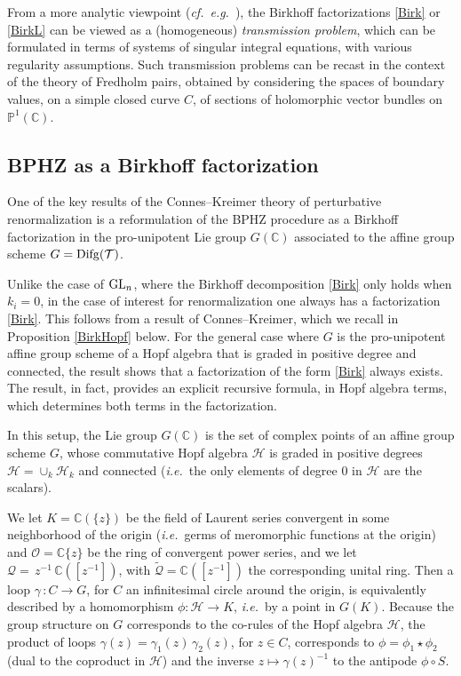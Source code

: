 \documentclass[10pt]{amsart}
\def\C{{\mathbb C}}
\renewcommand{\P}{{\mathbb P}}
\def\cH{{\mathcal H}}
\renewcommand{\O}{{\mathcal O}}
\def\Qc{{\mathcal Q}}
\def\sT{{\mathcal T}}
\def\GL{{\rm GL}}
\newcommand{\ie}{{\it i.e.\/}\ }
\newcommand{\eg}{{\it e.g.\/}\ }
\newcommand{\cf}{{\it cf.\/}\ }
\numberwithin{equation}{section}
\begin{document}
\smallskip

{}From a more analytic viewpoint (\cf \eg \cite{Boj}), the Birkhoff
factorizations \eqref{Birk} or \eqref{BirkL} can be
viewed as a (homogeneous) {\em transmission problem}, which can be
formulated in terms of systems of singular integral equations, with
various regularity assumptions. Such transmission problems can be
recast in the context of the theory of Fredholm pairs, obtained by
considering the spaces of boundary values, on a simple closed curve
$C$, of sections of holomorphic vector bundles on $\P^1(\C)$.

\bigskip

\medskip
\subsection*{BPHZ as a Birkhoff factorization}\hfill\medskip

One of the key results of the Connes--Kreimer theory of perturbative
renormalization \cite{CK1} \cite{CK2} is a reformulation of the BPHZ
procedure as a Birkhoff factorization in the pro-unipotent Lie group
$G(\C)$ associated to the affine group scheme $G={\rm Difg}(\sT)$.

\smallskip

Unlike the case of $\GL_n$, where the Birkhoff decomposition
\eqref{Birk} only holds when $k_i=0$, in the case of interest for
renormalization one always has a factorization \eqref{Birk}. This
follows from a result of Connes--Kreimer, which we recall in
Proposition \ref{BirkHopf} below. For the general case where $G$
is the pro-unipotent affine group scheme of a Hopf algebra that is
graded in positive degree and connected, the result shows that a
factorization of the form \eqref{Birk} always exists. The result,
in fact, provides an explicit recursive formula, in Hopf algebra
terms, which determines both terms in the factorization.

\smallskip

In this setup, the Lie group $G(\C)$ is the set of complex points of
an affine group scheme $G$, whose commutative Hopf algebra $\cH$ is
graded in positive degrees $\cH=\cup_k \cH_k$ and connected (\ie the
only elements of degree $0$ in $\cH$ are the scalars).

\smallskip

We let $K=\C(\{ z \})$ be the field of Laurent series convergent
in some neighborhood of the origin (\ie germs of meromorphic
functions at the origin) and $\O=\C\{ z \}$ be the ring of
convergent power series, and we let $\Qc=\,z^{-1}\,\C([z^{-1}])$,
with $\tilde\Qc=\C([z^{-1}])$ the corresponding unital ring. Then
a loop $\gamma\,:C\to G$, for $C$ an infinitesimal circle around
the origin, is equivalently described by a homomorphism $\phi: \cH
\to K$, \ie by a point in $G(K)$. Because the group structure on
$G$ corresponds to the co-rules of the Hopf algebra $\cH$, the
product of loops $\gamma(z)=\gamma_1(z)\,\gamma_2(z)$, for $z\in
C$, corresponds to $\phi= \phi_1\star\phi_2$ (dual to the
coproduct in $\cH$) and the inverse $ z\mapsto \gamma(z)^{-1}$ to
the antipode $\phi \circ S$.
\end{document}
